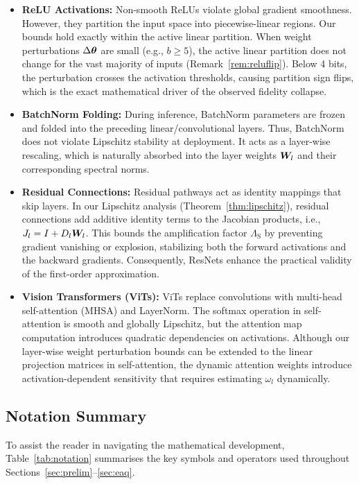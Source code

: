 \begin{itemize}
\item \textbf{ReLU Activations:} Non-smooth ReLUs violate global gradient smoothness. However, they partition the input space into piecewise-linear regions. Our bounds hold exactly within the active linear partition. When weight perturbations $\Delta\bm{\theta}$ are small (e.g., $b \ge 5$), the active linear partition does not change for the vast majority of inputs (Remark~\ref{rem:reluflip}). Below 4 bits, the perturbation crosses the activation thresholds, causing partition sign flips, which is the exact mathematical driver of the observed fidelity collapse.
\item \textbf{BatchNorm Folding:} During inference, BatchNorm parameters are frozen and folded into the preceding linear/convolutional layers. Thus, BatchNorm does not violate Lipschitz stability at deployment. It acts as a layer-wise rescaling, which is naturally absorbed into the layer weights $\bm{W}_l$ and their corresponding spectral norms.
\item \textbf{Residual Connections:} Residual pathways act as identity mappings that skip layers. In our Lipschitz analysis (Theorem~\ref{thm:lipschitz}), residual connections add additive identity terms to the Jacobian products, i.e., $J_l = I + D_l \bm{W}_l$. This bounds the amplification factor $\Lambda_{\mathrm{S}}$ by preventing gradient vanishing or explosion, stabilizing both the forward activations and the backward gradients. Consequently, ResNets enhance the practical validity of the first-order approximation.
\item \textbf{Vision Transformers (ViTs):} ViTs replace convolutions with multi-head self-attention (MHSA) and LayerNorm. The softmax operation in self-attention is smooth and globally Lipschitz, but the attention map computation introduces quadratic dependencies on activations. Although our layer-wise weight perturbation bounds can be extended to the linear projection matrices in self-attention, the dynamic attention weights introduce activation-dependent sensitivity that requires estimating $\omega_l$ dynamically.
\end{itemize}

\subsection{Notation Summary}
\label{sec:notationsummary}
To assist the reader in navigating the mathematical development, Table~\ref{tab:notation} summarises the key symbols and operators used throughout Sections~\ref{sec:prelim}--\ref{sec:eaq}.

